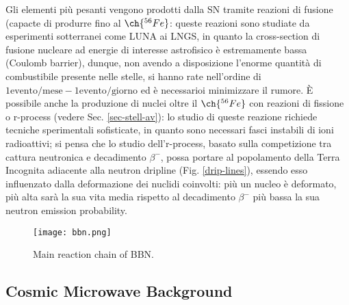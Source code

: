 Gli elementi più pesanti vengono prodotti dalla SN tramite reazioni di fusione (capacte di produrre fino al $ \ch{^{56} Fe} $: queste reazioni sono studiate da esperimenti sotterranei come LUNA ai LNGS, in quanto la cross-section di fusione nucleare ad energie di interesse astrofisico è estremamente bassa (Coulomb barrier), dunque, non avendo a disposizione l'enorme quantità di combustibile presente nelle stelle, si hanno rate nell'ordine di $ 1 \text{evento} / \text{mese} - 1 \text{evento} / \text{giorno} $ ed è necessarioi minimizzare il rumore. È possibile anche la produzione di nuclei oltre il $ \ch{^{56} Fe} $ con reazioni di fissione o r-process (vedere Sec. \ref{sec-stell-av}): lo studio di queste reazione richiede tecniche sperimentali sofisticate, in quanto sono necessari fasci instabili di ioni radioattivi; si pensa che lo studio dell'r-process, basato sulla competizione tra cattura neutronica e decadimento $ \beta^- $, possa portare al popolamento della Terra Incognita adiacente alla neutron dripline (Fig. \ref{drip-lines}), essendo esso influenzato dalla deformazione dei nuclidi coinvolti: più un nucleo è deformato, più alta sarà la sua vita media rispetto al decadimento $ \beta^- $  più bassa la sua neutron emission probability.

\begin{figure}[b]
	\centering
	\texttt{[image: bbn.png]}
	\caption{Main reaction chain of BBN.}
	\label{bbn}
\end{figure}

\subsection{Cosmic Microwave Background}
\label{sec-cmbr}

